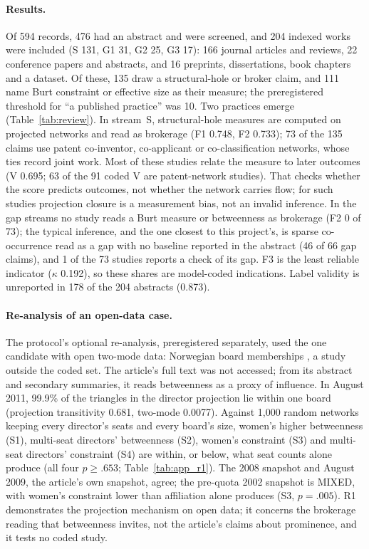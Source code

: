 \paragraph{Results.} Of 594 records, 476 had an abstract and were screened, and 204 indexed works were included (S 131, G1 31, G2 25, G3 17): 166 journal articles and reviews, 22 conference papers and abstracts, and 16 preprints, dissertations, book chapters and a dataset. Of these, 135 draw a structural-hole or broker claim, and 111 name Burt constraint or effective size as their measure; the preregistered threshold for ``a published practice'' was 10. Two practices emerge (Table~\ref{tab:review}). In stream~S, structural-hole measures are computed on projected networks and read as brokerage (F1 0.748, F2 0.733); 73 of the 135 claims use patent co-inventor, co-applicant or co-classification networks, whose ties record joint work. Most of these studies relate the measure to later outcomes (V 0.695; 63 of the 91 coded V are patent-network studies). That checks whether the score predicts outcomes, not whether the network carries flow; for such studies projection closure is a measurement bias, not an invalid inference. In the gap streams no study reads a Burt measure or betweenness as brokerage (F2 0 of 73); the typical inference, and the one closest to this project's, is sparse co-occurrence read as a gap with no baseline reported in the abstract (46 of 66 gap claims), and 1 of the 73 studies reports a check of its gap. F3 is the least reliable indicator ($\kappa$ 0.192), so these shares are model-coded indications. Label validity is unreported in 178 of the 204 abstracts (0.873).

\paragraph{Re-analysis of an open-data case.} The protocol's optional re-analysis, preregistered separately, used the one candidate with open two-mode data: Norwegian board memberships \citep{seierstad2011few}, a study outside the coded set. The article's full text was not accessed; from its abstract and secondary summaries, it reads betweenness as a proxy of influence. In August 2011, 99.9\% of the triangles in the director projection lie within one board (projection transitivity 0.681, two-mode 0.0077). Against 1,000 random networks keeping every director's seats and every board's size, women's higher betweenness (S1), multi-seat directors' betweenness (S2), women's constraint (S3) and multi-seat directors' constraint (S4) are within, or below, what seat counts alone produce (all four $p \geq .653$; Table~\ref{tab:app_r1}). The 2008 snapshot and August 2009, the article's own snapshot, agree; the pre-quota 2002 snapshot is MIXED, with women's constraint lower than affiliation alone produces (S3, $p = .005$). R1 demonstrates the projection mechanism on open data; it concerns the brokerage reading that betweenness invites, not the article's claims about prominence, and it tests no coded study.

